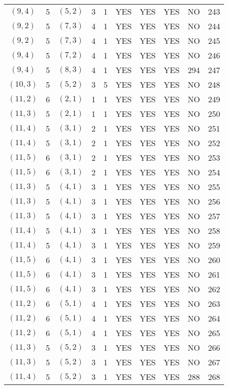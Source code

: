 \begin{longtable}{|c|c|c|c|c|c|c|c|c|c|}
$(9, 4)$ & 5 & $(5, 2)$ & 3 & 1 & YES & YES & YES & NO & 243\\
$(9, 2)$ & 5 & $(7, 3)$ & 4 & 1 & YES & YES & YES & NO & 244\\
$(9, 2)$ & 5 & $(7, 3)$ & 4 & 1 & YES & YES & YES & NO & 245\\
$(9, 4)$ & 5 & $(7, 2)$ & 4 & 1 & YES & YES & YES & NO & 246\\
$(9, 4)$ & 5 & $(8, 3)$ & 4 & 1 & YES & YES & YES & 294 & 247\\
$(10, 3)$ & 5 & $(5, 2)$ & 3 & 5 & YES & YES & YES & NO & 248\\
$(11, 2)$ & 6 & $(2, 1)$ & 1 & 1 & YES & YES & YES & NO & 249\\
$(11, 3)$ & 5 & $(2, 1)$ & 1 & 1 & YES & YES & YES & NO & 250\\
$(11, 4)$ & 5 & $(3, 1)$ & 2 & 1 & YES & YES & YES & NO & 251\\
$(11, 4)$ & 5 & $(3, 1)$ & 2 & 1 & YES & YES & YES & NO & 252\\
$(11, 5)$ & 6 & $(3, 1)$ & 2 & 1 & YES & YES & YES & NO & 253\\
$(11, 5)$ & 6 & $(3, 1)$ & 2 & 1 & YES & YES & YES & NO & 254\\
$(11, 3)$ & 5 & $(4, 1)$ & 3 & 1 & YES & YES & YES & NO & 255\\
$(11, 3)$ & 5 & $(4, 1)$ & 3 & 1 & YES & YES & YES & NO & 256\\
$(11, 3)$ & 5 & $(4, 1)$ & 3 & 1 & YES & YES & YES & NO & 257\\
$(11, 4)$ & 5 & $(4, 1)$ & 3 & 1 & YES & YES & YES & NO & 258\\
$(11, 4)$ & 5 & $(4, 1)$ & 3 & 1 & YES & YES & YES & NO & 259\\
$(11, 5)$ & 6 & $(4, 1)$ & 3 & 1 & YES & YES & YES & NO & 260\\
$(11, 5)$ & 6 & $(4, 1)$ & 3 & 1 & YES & YES & YES & NO & 261\\
$(11, 5)$ & 6 & $(4, 1)$ & 3 & 1 & YES & YES & YES & NO & 262\\
$(11, 2)$ & 6 & $(5, 1)$ & 4 & 1 & YES & YES & YES & NO & 263\\
$(11, 2)$ & 6 & $(5, 1)$ & 4 & 1 & YES & YES & YES & NO & 264\\
$(11, 2)$ & 6 & $(5, 1)$ & 4 & 1 & YES & YES & YES & NO & 265\\
$(11, 3)$ & 5 & $(5, 2)$ & 3 & 1 & YES & YES & YES & NO & 266\\
$(11, 3)$ & 5 & $(5, 2)$ & 3 & 1 & YES & YES & YES & NO & 267\\
$(11, 4)$ & 5 & $(5, 2)$ & 3 & 1 & YES & YES & YES & 288 & 268\\

\end{longtable}

